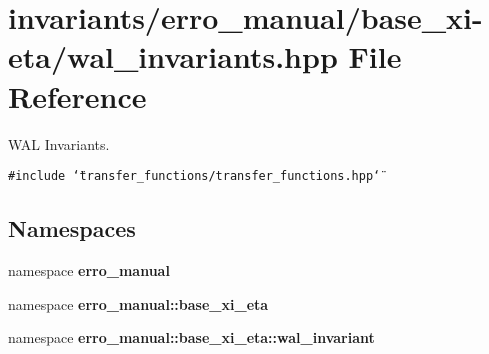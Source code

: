 \section{invariants/erro\_\-manual/base\_\-xi-eta/wal\_\-invariants.hpp File Reference}
\label{wal__invariants_8hpp}
WAL Invariants. 

{\tt \#include \char`\"{}transfer\_\-functions/transfer\_\-functions.hpp\char`\"{}}\par
\subsection*{Namespaces}
\begin{CompactItemize}
\item 
namespace \textbf{erro\_\-manual}
\item 
namespace \textbf{erro\_\-manual::base\_\-xi\_\-eta}
\item 
namespace {\bf erro\_\-manual::base\_\-xi\_\-eta::wal\_\-invariant}
\end{CompactItemize}
